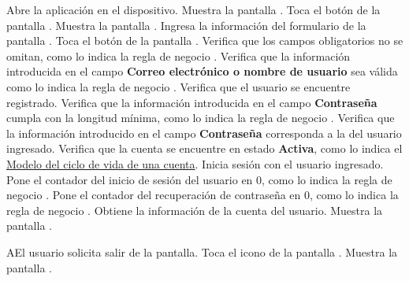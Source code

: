 \begin{UCtrayectoria}
    \UCpaso[\UCactor] Abre la aplicación en el dispositivo.
    \UCpaso[\UCsist]  Muestra la pantalla .
    \UCpaso[\UCactor] Toca el botón  de la pantalla .
    \UCpaso[\UCsist] Muestra la pantalla .
    \UCpaso[\UCactor] Ingresa la información del formulario de la pantalla . \label{cua11:tb} 
    \UCpaso[\UCactor] Toca el botón  de la pantalla . 
    \UCpaso[\UCsist] Verifica que los campos obligatorios no se omitan, como lo indica la regla de negocio . 
    \UCpaso[\UCsist] Verifica que la información introducida en el campo \textbf{Correo electrónico o nombre de usuario} sea válida como lo indica la regla de negocio . 
    \UCpaso[\UCsist] Verifica que el usuario se encuentre registrado. 
    \UCpaso[\UCsist] Verifica que la información introducida en el campo \textbf{Contraseña} cumpla con la longitud mínima, como lo indica la regla de negocio . 
    \UCpaso[\UCsist] Verifica que la información introducido en el campo \textbf{Contraseña} corresponda a la del usuario ingresado.  \label{cua11:g1} 
    \UCpaso[\UCsist] Verifica que la cuenta se encuentre en estado \textbf{Activa}, como lo indica el \hyperlink{cv:Cuenta}{Modelo del ciclo de vida de una cuenta}. 
    \UCpaso[\UCsist] Inicia sesión con el usuario ingresado.
    \UCpaso[\UCsist] Pone el contador del inicio de sesión del usuario en 0, como lo indica la regla de negocio .
    \UCpaso[\UCsist] Pone el contador del recuperación de contraseña en 0, como lo indica la regla de negocio .
    \UCpaso[\UCsist] Obtiene la información de la cuenta del usuario.
    \UCpaso[\UCsist] Muestra la pantalla .
    
   
 \end{UCtrayectoria}
 
 \begin{UCtrayectoriaA}{A}{El usuario solicita salir de la pantalla.}
    \UCpaso[\UCactor] Toca el icono \btnRegresar de la pantalla .
	\UCpaso[\UCsist] Muestra la pantalla . 
 \end{UCtrayectoriaA}

